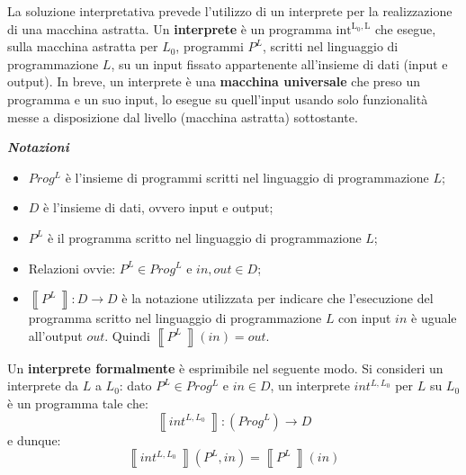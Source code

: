 \documentclass[a4paper]{article}
\newcommand{\exec}[1]{\left\llbracket #1\:\right\rrbracket}
\begin{document}
	La soluzione interpretativa prevede l'utilizzo di un interprete per la realizzazione di una macchina astratta. Un \textcolor{Red3}{\textbf{interprete}} è un programma $\mathrm{int}^{\mathrm{L_{0}, L}}$ che esegue, sulla macchina astratta per $L_{0}$, programmi $P^{L}$, scritti nel linguaggio di programmazione $L$, su un input fissato appartenente all'insieme di dati (input e output). In breve, un interprete è una \textbf{macchina universale} che preso un programma e un suo input, lo esegue su quell'input usando solo funzionalità messe a disposizione dal livello (macchina astratta) sottostante.
	\begin{boxdef}
		\begin{center}
			\textcolor{Red3}{\textbf{\emph{Notazioni}}}
		\end{center}
		\begin{itemize}
			\item $Prog^{L}$ è l'insieme di programmi scritti nel linguaggio di programmazione $L$;
			\item $D$ è l'insieme di dati, ovvero input e output;
			\item $P^{L}$ è il programma scritto nel linguaggio di programmazione $L$;
			\item Relazioni ovvie: $P^{L} \in Prog^{L}$ e $in, out \in D$;
			\item $\exec{P^{L}}: D \longrightarrow D$ è la notazione utilizzata per indicare che l'esecuzione del programma scritto nel linguaggio di programmazione $L$ con input $in$ è uguale all'output $out$. Quindi $\exec{P^{L}}\left(in\right) = out$.
		\end{itemize}
	\end{boxdef}
	\begin{boxdef}
		Un \textcolor{Red3}{\textbf{interprete formalmente}} è esprimibile nel seguente modo.\newline
		Si consideri un interprete da $L$ a $L_{0}$: dato $P^{L} \in Prog^{L}$ e $in \in D$, un interprete $int^{L, L_{0}}$ per $L$ su $L_{0}$ è un programma tale che:
		\begin{equation*}
			\exec{int^{L, L_{0}}}: \left(Prog^{L}\right) \longrightarrow D
		\end{equation*}
		e dunque:
		\begin{equation*}
			\exec{int^{L, L_{0}}}\left(P^{L}, in\right) = \exec{P^{L}}\left(in\right)
		\end{equation*}
	\end{boxdef}
	
\end{document}
